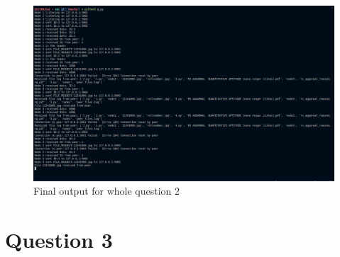 \documentclass{exam}
\begin{document}
\begin{figure}[H]
    \centering
    \includegraphics[width=1.1\textwidth]{Q2final_output.png } 
    \caption{Final output for whole question 2}
    \label{fig:output1}
\end{figure}
\newpage
\section*{Question 3 }
\end{document}
